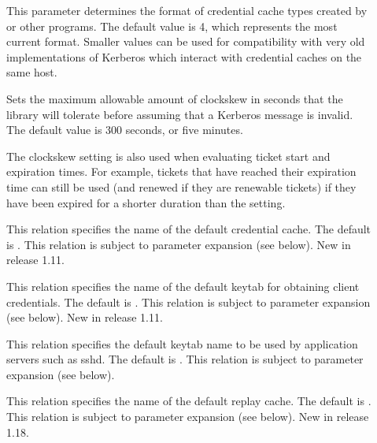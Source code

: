 \documentclass[letterpaper,10pt,english]{sphinxmanual}
\begin{document}
\begin{description}
\item[{}] \leavevmode
\sphinxAtStartPar
This parameter determines the format of credential cache types
created by  or other programs.  The default value
is 4, which represents the most current format.  Smaller values
can be used for compatibility with very old implementations of
Kerberos which interact with credential caches on the same host.

\item[{}] \leavevmode
\sphinxAtStartPar
Sets the maximum allowable amount of clockskew in seconds that the
library will tolerate before assuming that a Kerberos message is
invalid.  The default value is 300 seconds, or five minutes.

\sphinxAtStartPar
The clockskew setting is also used when evaluating ticket start
and expiration times.  For example, tickets that have reached
their expiration time can still be used (and renewed if they are
renewable tickets) if they have been expired for a shorter
duration than the  setting.

\item[{}] \leavevmode
\sphinxAtStartPar
This relation specifies the name of the default credential cache.
The default is {\hyperref[\detokenize{mitK5defaults:paths}]{}}.  This relation is subject to parameter
expansion (see below).  New in release 1.11.

\item[{}] \leavevmode
\sphinxAtStartPar
This relation specifies the name of the default keytab for
obtaining client credentials.  The default is {\hyperref[\detokenize{mitK5defaults:paths}]{}}.  This
relation is subject to parameter expansion (see below).
New in release 1.11.

\item[{}] \leavevmode
\sphinxAtStartPar
This relation specifies the default keytab name to be used by
application servers such as sshd.  The default is {\hyperref[\detokenize{mitK5defaults:paths}]{}}.  This
relation is subject to parameter expansion (see below).

\item[{}] \leavevmode
\sphinxAtStartPar
This relation specifies the name of the default replay cache.
The default is .  This relation is subject to parameter
expansion (see below).  New in release 1.18.


\end{description}
\end{document}
